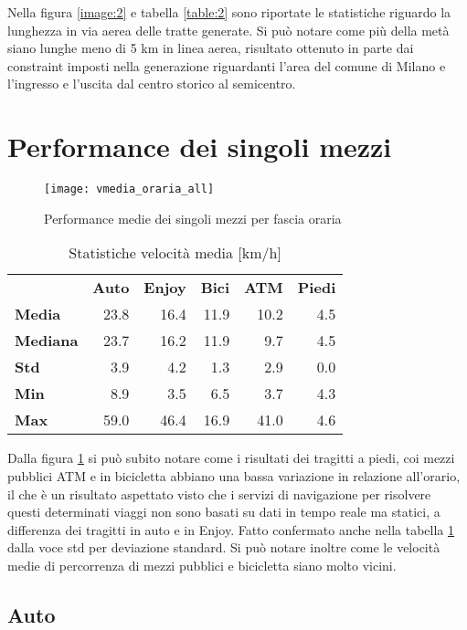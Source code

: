 Nella  figura \ref{image:2} e tabella \ref{table:2} sono riportate le statistiche riguardo la lunghezza in via aerea delle tratte generate. Si può notare come più della metà siano lunghe meno di 5 km in linea aerea, risultato ottenuto in parte dai constraint imposti nella generazione riguardanti l'area del comune di Milano e l'ingresso e l'uscita dal centro storico al semicentro.

\section{Performance dei singoli mezzi}

\begin{figure}[H]
\texttt{[image: vmedia\_oraria\_all]}
\caption{Performance medie dei singoli mezzi per fascia oraria}
\label{image:15}
\end{figure}

\begin{table}[H]
\centering
\begin{tabular}{ | l r r r r r | }
\hline
& \textbf{Auto} & \textbf{Enjoy} & \textbf{Bici} & \textbf{ATM} & \textbf{Piedi} \\
\textbf{Media}   & 23.8 & 16.4 & 11.9 & 10.2 & 4.5 \\
\textbf{Mediana} & 23.7 & 16.2 & 11.9 &  9.7 & 4.5 \\
\textbf{Std}     &  3.9 &  4.2 &  1.3 &  2.9 & 0.0 \\
\textbf{Min}     &  8.9 &  3.5 &  6.5 &  3.7  & 4.3 \\
\textbf{Max}     & 59.0 & 46.4 & 16.9 & 41.0 & 4.6 \\
\hline
\end{tabular}
\caption{Statistiche velocità media [km/h]}
\label{table:3}
\end{table}

Dalla figura \ref{image:15} si può subito notare come i risultati dei tragitti a piedi, coi mezzi pubblici ATM e in bicicletta abbiano una bassa variazione in relazione all'orario, il che è un risultato aspettato visto che i servizi di navigazione per risolvere questi determinati viaggi non sono basati su dati in tempo reale ma statici, a differenza dei tragitti in auto e in Enjoy. Fatto confermato anche nella tabella \ref{table:3} dalla voce std per deviazione standard. Si può notare inoltre come le velocità medie di percorrenza di mezzi pubblici e bicicletta siano molto vicini.

\subsection{Auto}


